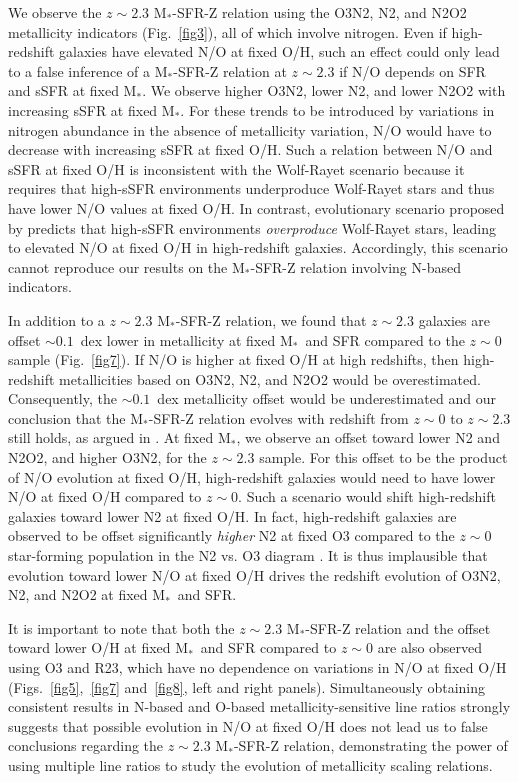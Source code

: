 \documentclass[iop,twocolappendix]{emulateapj}
\newcommand{\mstar}{$\mbox{M}_*$}
\begin{document}
We observe the $z\sim2.3$ \mstar-SFR-Z relation using the O3N2, N2, and N2O2 metallicity indicators
 (Fig.~\ref{fig3}), all of which involve nitrogen.
  Even if high-redshift galaxies have elevated N/O at fixed O/H, such an effect could only lead to a
 false inference of a \mstar-SFR-Z relation at $z\sim2.3$ if N/O depends on SFR and sSFR at fixed \mstar.
  We observe higher O3N2, lower N2, and lower N2O2 with increasing sSFR at fixed \mstar.
  For these trends to be introduced by variations in nitrogen abundance in the absence of
 metallicity variation, N/O would have to decrease with increasing sSFR at fixed O/H.
  Such a relation between N/O and sSFR at fixed O/H is inconsistent with the Wolf-Rayet
 scenario because it requires that high-sSFR environments underproduce Wolf-Rayet stars
 and thus have lower N/O values at fixed O/H.  In contrast, evolutionary scenario proposed by \citet{mas14}
 predicts that high-sSFR environments \textit{overproduce} Wolf-Rayet stars, leading to elevated
 N/O at fixed O/H in high-redshift galaxies.
  Accordingly, this scenario cannot reproduce our results on the \mstar-SFR-Z relation involving N-based indicators.

In addition to a $z\sim2.3$ \mstar-SFR-Z relation, we found that $z\sim2.3$ galaxies are offset $\sim0.1$~dex
 lower in metallicity at fixed \mstar\ and SFR compared to the $z\sim0$ sample (Fig.~\ref{fig7}).
  If N/O is higher at fixed O/H at high redshifts, then high-redshift metallicities based on O3N2, N2, and N2O2
 would be overestimated.  Consequently, the $\sim0.1$~dex metallicity offset would be underestimated and
 our conclusion that the \mstar-SFR-Z relation evolves with redshift from $z\sim0$ to $z\sim2.3$
 still holds, as argued in \citet{san15}.
  At fixed \mstar, we observe an offset toward lower N2 and N2O2, and higher O3N2,
 for the $z\sim2.3$ sample.
  For this offset to be the product of N/O evolution at fixed O/H,
 high-redshift galaxies would need to have lower N/O at fixed O/H compared to $z\sim0$.
  Such a scenario would shift high-redshift galaxies toward lower N2 at fixed O/H.
  In fact, high-redshift galaxies are observed to be offset significantly \textit{higher} N2
 at fixed O3 compared to the $z\sim0$ star-forming population in the
 N2 vs. O3 diagram \citep[e.g.,][]{sha05,sha15,ste14,san16a,str17}.
  It is thus implausible that evolution toward lower N/O at fixed O/H drives the redshift evolution of O3N2, N2,
 and N2O2 at fixed \mstar\ and SFR.

It is important to note that both the $z\sim2.3$ \mstar-SFR-Z relation and the offset toward lower O/H
 at fixed \mstar\ and SFR compared to $z\sim0$ are also observed using O3 and R23, which have no dependence on variations
 in N/O at fixed O/H (Figs.~\ref{fig5},~\ref{fig7} and~\ref{fig8}, left and right panels).
  Simultaneously obtaining consistent results
 in N-based and O-based metallicity-sensitive line ratios strongly suggests that possible evolution in N/O
 at fixed O/H does not lead us to false conclusions regarding the $z\sim2.3$ \mstar-SFR-Z relation,
 demonstrating the power of using multiple line ratios to study the evolution of metallicity scaling relations.
\end{document}
